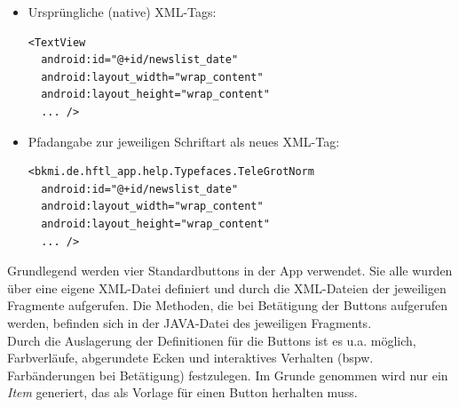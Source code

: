 \begin{description}
\begin{itemize}
\begin{itemize}
\begin{itemize}
\item Ursprüngliche (native) XML-Tags:
\lstset{language=XML}
\begin{lstlisting}[caption={Normales TextView}]
<TextView
  android:id="@+id/newslist_date"
  android:layout_width="wrap_content"
  android:layout_height="wrap_content"
  ... />
\end{lstlisting}
\item Pfadangabe zur jeweiligen Schriftart als neues XML-Tag:
\begin{lstlisting}[caption={Einbinden von  TeleGrotNorm}]
<bkmi.de.hftl_app.help.Typefaces.TeleGrotNorm
  android:id="@+id/newslist_date"
  android:layout_width="wrap_content"
  android:layout_height="wrap_content"
  ... />
\end{lstlisting}
\end{itemize}
\end{itemize}
\end{itemize}




\newpage
{}
\label{button}
Grundlegend werden vier Standardbuttons in der App verwendet. Sie alle wurden über eine eigene XML-Datei definiert und durch die XML-Dateien der jeweiligen Fragmente aufgerufen. Die Methoden, die bei Betätigung der Buttons aufgerufen werden, befinden sich in der JAVA-Datei des jeweiligen Fragments.\\
Durch die Auslagerung der Definitionen für die Buttons ist es u.a. möglich, Farbverläufe, abgerundete Ecken und interaktives Verhalten (bspw. Farbänderungen bei Betätigung) festzulegen. Im Grunde genommen wird nur ein \textit{Item} generiert, das als Vorlage für einen Button herhalten muss.\\



\end{description}
